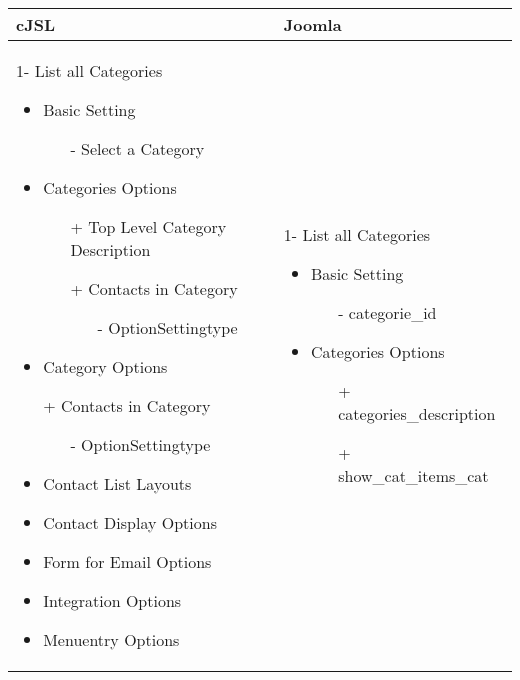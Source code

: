 \begin{minipage}{0.7\textwidth}
\begin{tabular}{|p{} | p{}|}
\hline
\textbf{cJSL} & \textbf{Joomla} \\ 
\hline
 1- List all Categories
   \begin{itemize}
     \item Basic  Setting 
    		\begin{enumerate}
    			\item[-] Select a Category
    		\end{enumerate}
    	\item Categories Options
 	   	\begin{enumerate}
 	    \item[+] Top Level Category Description
 	    \item[+] Contacts in Category 
 	    	  \begin{enumerate}
 	    			 \item[-] OptionSettingtype
 	    	\end{enumerate}
 	   \end{enumerate}
    	\item Category Options
    	\item[+] Contacts in Category 
    		    	  \begin{enumerate}
    		    			 \item[-] OptionSettingtype
    		    	\end{enumerate}
    	\item Contact List Layouts
 	\item Contact Display Options
 	\item Form for Email Options
 	\item Integration Options
 	\item Menuentry Options
  \end{itemize}
 & 
1- List all Categories
  \begin{itemize}
    \item Basic  Setting 
   		\begin{enumerate}
   			\item[-] categorie\_id
   		\end{enumerate}
   	\item Categories Options
	   	\begin{enumerate}
	    \item[+] categories\_description
	    \item[+] show\_cat\_items\_cat 
	    	  \begin{enumerate}

\end{enumerate}
\end{enumerate}
\end{itemize}
\end{tabular}
\end{minipage}
